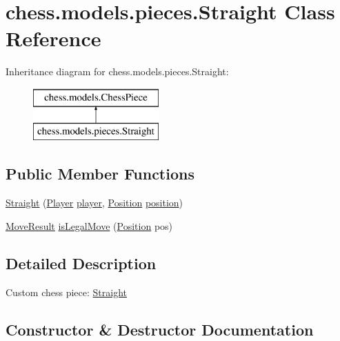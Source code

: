\hypertarget{classchess_1_1models_1_1pieces_1_1_straight}{}\section{chess.\+models.\+pieces.\+Straight Class Reference}
\label{classchess_1_1models_1_1pieces_1_1_straight}
Inheritance diagram for chess.\+models.\+pieces.\+Straight\+:\begin{figure}[H]
\begin{center}
\leavevmode
\includegraphics[height=2.000000cm]{classchess_1_1models_1_1pieces_1_1_straight}
\end{center}
\end{figure}
\subsection*{Public Member Functions}
\begin{DoxyCompactItemize}
\item 
\mbox{\hyperlink{classchess_1_1models_1_1pieces_1_1_straight_aa3bc64b25b752e3390bc41a79c8fae40}{Straight}} (\mbox{\hyperlink{enumchess_1_1models_1_1enums_1_1_player}{Player}} \mbox{\hyperlink{classchess_1_1models_1_1_chess_piece_a3bcc8a24667318b5aab8c146adcc3eb7}{player}}, \mbox{\hyperlink{classchess_1_1models_1_1_position}{Position}} \mbox{\hyperlink{classchess_1_1models_1_1_chess_piece_a0e4f8616b75e548f269d3971846396f3}{position}})
\item 
\mbox{\hyperlink{enumchess_1_1models_1_1enums_1_1_move_result}{Move\+Result}} \mbox{\hyperlink{classchess_1_1models_1_1pieces_1_1_straight_a9c13a278d3270f9f8f28809f34e50e1f}{is\+Legal\+Move}} (\mbox{\hyperlink{classchess_1_1models_1_1_position}{Position}} pos)
\end{DoxyCompactItemize}


\subsection{Detailed Description}
Custom chess piece\+: \mbox{\hyperlink{classchess_1_1models_1_1pieces_1_1_straight}{Straight}} 

\subsection{Constructor \& Destructor Documentation}
\mbox{\label{classchess_1_1models_1_1pieces_1_1_straight_aa3bc64b25b752e3390bc41a79c8fae40}} 
